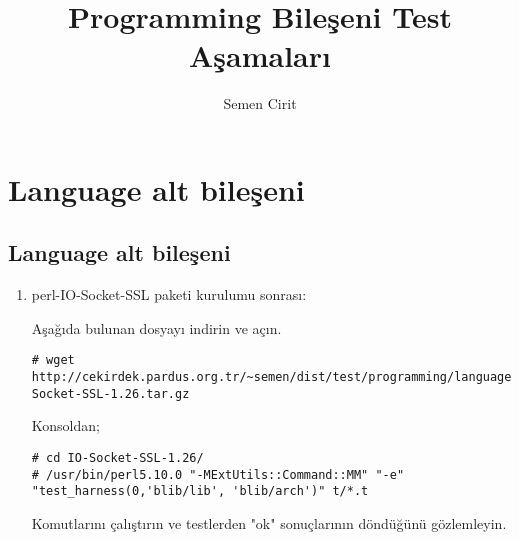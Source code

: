 \documentclass[a4paper,10pt]{article}
\title{Programming Bileşeni Test Aşamaları}
\author{Semen Cirit}
\begin{document}
\maketitle
\section{Language alt bileşeni}
\subsection{Language alt bileşeni}
\begin{enumerate}
\item perl-IO-Socket-SSL paketi kurulumu sonrası:

Aşağıda bulunan dosyayı indirin ve açın.
\begin{verbatim}
# wget http://cekirdek.pardus.org.tr/~semen/dist/test/programming/language/perl/IO-Socket-SSL-1.26.tar.gz
\end{verbatim}

Konsoldan;
\begin{verbatim}
# cd IO-Socket-SSL-1.26/
# /usr/bin/perl5.10.0 "-MExtUtils::Command::MM" "-e" "test_harness(0,'blib/lib', 'blib/arch')" t/*.t
\end{verbatim}

Komutlarını çalıştırın ve testlerden "ok" sonuçlarının döndüğünü gözlemleyin.
\end{enumerate}
\end{document}
